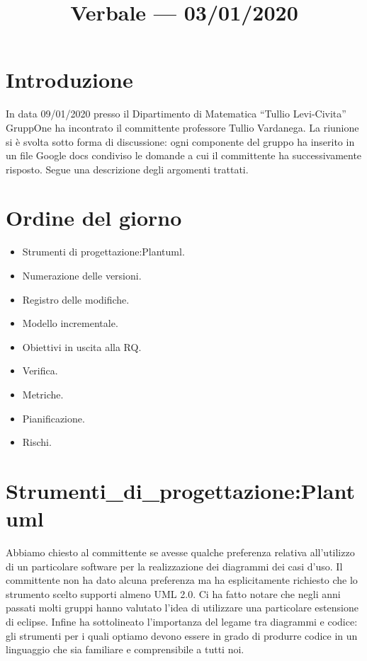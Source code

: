 \documentclass{article}
\title{Verbale --- 03/01/2020}
\begin{document}


\section{Introduzione}
\label{sec:introduzione}

In data 09/01/2020 presso il Dipartimento di Matematica ``Tullio Levi-Civita'' GruppOne ha incontrato il committente professore Tullio Vardanega. La riunione si è svolta sotto forma di discussione: ogni componente del gruppo ha inserito in un file Google docs condiviso le domande a cui il committente ha successivamente risposto. Segue una descrizione degli argomenti trattati.
\section{Ordine del giorno}%
\label{sec:ordine_del_giorno}

\begin{itemize}
  \item Strumenti di progettazione:Plantuml.
  \item Numerazione delle versioni.
  \item Registro delle modifiche.
  \item Modello incrementale.
  \item Obiettivi in uscita alla RQ.
  \item Verifica.
  \item Metriche.
  \item Pianificazione.
  \item Rischi.
\end{itemize}

\section{Strumenti_di_progettazione:Plantuml}%
\label{sec:strumenti_di_progettazione:Plantuml}

Abbiamo chiesto al committente se avesse qualche preferenza relativa all'utilizzo di un particolare software per la realizzazione dei diagrammi dei casi d'uso. Il committente non ha dato alcuna preferenza ma ha esplicitamente richiesto che lo strumento scelto supporti almeno UML 2.0. Ci ha fatto notare che negli anni passati molti gruppi hanno valutato l'idea di utilizzare una particolare estensione di eclipse. Infine ha sottolineato l'importanza del legame tra diagrammi e codice: gli strumenti per i quali optiamo devono essere in grado di produrre codice in un linguaggio che sia familiare e comprensibile a tutti noi.
\end{document}
